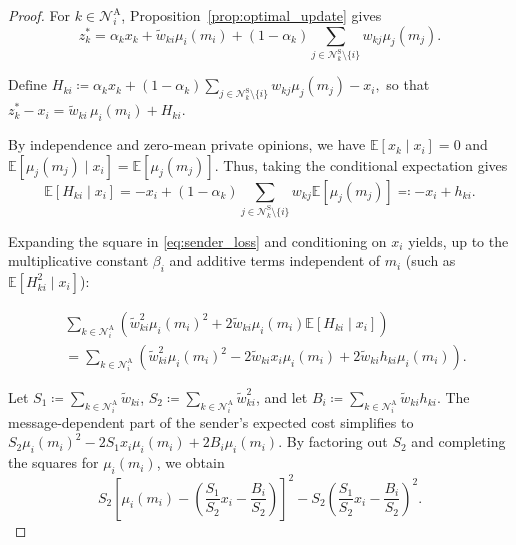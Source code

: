 \documentclass[journal,twoside,web]{ieeecolor}
\begin{document}
\begin{proof}
    For $k\in\mathcal N_i^{\mathrm A}$, Proposition~\ref{prop:optimal_update} gives
    \[
        z_k^*
        =
        \alpha_kx_k
        +\widetilde{w}_{ki}\mu_i(m_i)
        +(1-\alpha_k)
        \sum_{j\in\mathcal N_k^{\mathrm S}\setminus\{i\}}
        w_{kj}\mu_j(m_j).
    \]

    $\text{Define }
        H_{ki}
        \coloneqq
        \alpha_kx_k
        +(1-\alpha_k)
        \sum_{j\in\mathcal N_k^{\mathrm S}\setminus\{i\}}
        w_{kj}\mu_j(m_j)
        -x_i,
    $
    so that $z_k^*-x_i=\widetilde{w}_{ki}\,\mu_i(m_i)+H_{ki}$.

    By independence and zero-mean private opinions, we have $\mathbb E[x_k \mid x_i] = 0$ and $\mathbb E[\mu_j(m_j) \mid x_i] = \mathbb E[\mu_j(m_j)]$. Thus, taking the conditional expectation gives
    \[
        \mathbb E[H_{ki}\mid x_i] = -x_i + (1-\alpha_k)\!\!\!\!\sum_{j\in\mathcal N_k^{\mathrm S}\setminus\{i\}}\!\!\!\! w_{kj}\mathbb E[\mu_j(m_j)] \eqqcolon -x_i + h_{ki}.
    \]

    Expanding the square in \eqref{eq:sender_loss} and conditioning on $x_i$ yields, up to the multiplicative constant $\beta_i$ and additive terms independent of $m_i$ (such as $\mathbb E[H_{ki}^2\mid x_i]$):

    \begin{align*}
         & \sum_{k\in\mathcal N_i^{\mathrm A}}
        \left(
        \widetilde{w}_{ki}^2\mu_i(m_i)^2
        + 2\widetilde{w}_{ki}\mu_i(m_i)\mathbb E[H_{ki}\mid x_i]
        \right)\nonumber                       \\
         & =
        \sum_{k\in\mathcal N_i^{\mathrm A}}
        \left(
        \widetilde{w}_{ki}^2\mu_i(m_i)^2
        - 2\widetilde{w}_{ki}x_i\mu_i(m_i)
        + 2\widetilde{w}_{ki}h_{ki}\mu_i(m_i)
        \right).
    \end{align*}

    Let $S_1\coloneqq\sum_{k\in\mathcal N_i^{\mathrm A}}\widetilde{w}_{ki}$, $S_2\coloneqq\sum_{k\in\mathcal N_i^{\mathrm A}}\widetilde{w}_{ki}^2$, and let $B_i \coloneqq \sum_{k\in\mathcal N_i^{\mathrm A}} \widetilde{w}_{ki} h_{ki}$. The message-dependent part of the sender's expected cost simplifies to $S_2\mu_i(m_i)^2-2S_1x_i\mu_i(m_i) + 2B_i\mu_i(m_i)$.
    By factoring out $S_2$ and completing the squares for $\mu_i(m_i)$, we obtain
    \begin{equation*}
        S_2\left[\mu_i(m_i) - \left(\frac{S_1}{S_2}x_i - \frac{B_i}{S_2}\right)\right]^2 - S_2\left(\frac{S_1}{S_2}x_i - \frac{B_i}{S_2}\right)^2.
    \end{equation*}


\end{proof}
\end{document}
